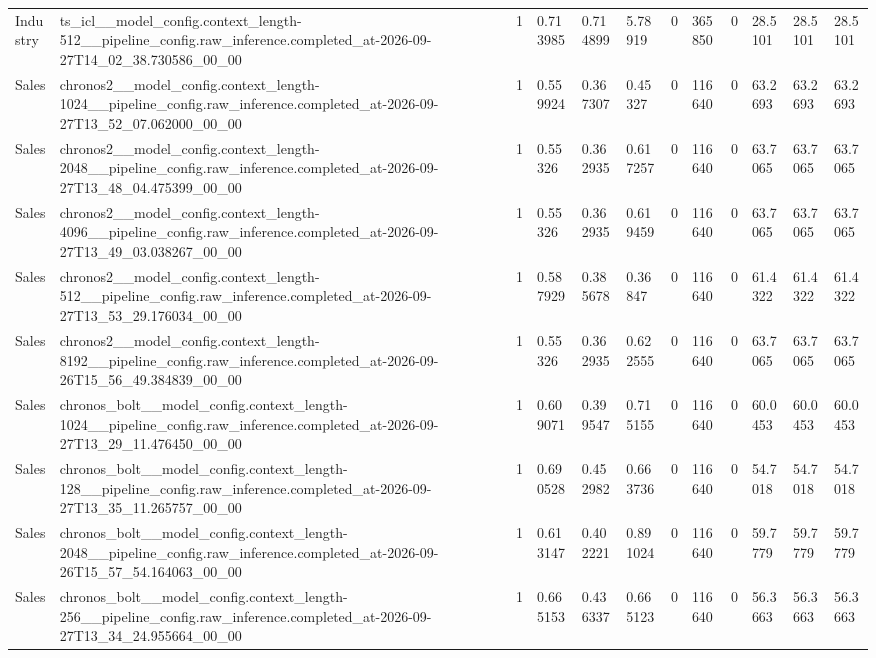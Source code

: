 \begin{tabular}{llllllllllll}
Industry & ts\_icl\_\_model\_config.context\_length-512\_\_pipeline\_config.raw\_inference.completed\_at-2026-09-27T14\_02\_38.730586\_00\_00 & 1 & 0.713985 & 0.714899 & 5.78919 & 0 & 365850 & 0 & 28.5101 & 28.5101 & 28.5101 \\
Sales & chronos2\_\_model\_config.context\_length-1024\_\_pipeline\_config.raw\_inference.completed\_at-2026-09-27T13\_52\_07.062000\_00\_00 & 1 & 0.559924 & 0.367307 & 0.45327 & 0 & 116640 & 0 & 63.2693 & 63.2693 & 63.2693 \\
Sales & chronos2\_\_model\_config.context\_length-2048\_\_pipeline\_config.raw\_inference.completed\_at-2026-09-27T13\_48\_04.475399\_00\_00 & 1 & 0.55326 & 0.362935 & 0.617257 & 0 & 116640 & 0 & 63.7065 & 63.7065 & 63.7065 \\
Sales & chronos2\_\_model\_config.context\_length-4096\_\_pipeline\_config.raw\_inference.completed\_at-2026-09-27T13\_49\_03.038267\_00\_00 & 1 & 0.55326 & 0.362935 & 0.619459 & 0 & 116640 & 0 & 63.7065 & 63.7065 & 63.7065 \\
Sales & chronos2\_\_model\_config.context\_length-512\_\_pipeline\_config.raw\_inference.completed\_at-2026-09-27T13\_53\_29.176034\_00\_00 & 1 & 0.587929 & 0.385678 & 0.36847 & 0 & 116640 & 0 & 61.4322 & 61.4322 & 61.4322 \\
Sales & chronos2\_\_model\_config.context\_length-8192\_\_pipeline\_config.raw\_inference.completed\_at-2026-09-26T15\_56\_49.384839\_00\_00 & 1 & 0.55326 & 0.362935 & 0.622555 & 0 & 116640 & 0 & 63.7065 & 63.7065 & 63.7065 \\
Sales & chronos\_bolt\_\_model\_config.context\_length-1024\_\_pipeline\_config.raw\_inference.completed\_at-2026-09-27T13\_29\_11.476450\_00\_00 & 1 & 0.609071 & 0.399547 & 0.715155 & 0 & 116640 & 0 & 60.0453 & 60.0453 & 60.0453 \\
Sales & chronos\_bolt\_\_model\_config.context\_length-128\_\_pipeline\_config.raw\_inference.completed\_at-2026-09-27T13\_35\_11.265757\_00\_00 & 1 & 0.690528 & 0.452982 & 0.663736 & 0 & 116640 & 0 & 54.7018 & 54.7018 & 54.7018 \\
Sales & chronos\_bolt\_\_model\_config.context\_length-2048\_\_pipeline\_config.raw\_inference.completed\_at-2026-09-26T15\_57\_54.164063\_00\_00 & 1 & 0.613147 & 0.402221 & 0.891024 & 0 & 116640 & 0 & 59.7779 & 59.7779 & 59.7779 \\
Sales & chronos\_bolt\_\_model\_config.context\_length-256\_\_pipeline\_config.raw\_inference.completed\_at-2026-09-27T13\_34\_24.955664\_00\_00 & 1 & 0.665153 & 0.436337 & 0.665123 & 0 & 116640 & 0 & 56.3663 & 56.3663 & 56.3663 \\

\end{tabular}
